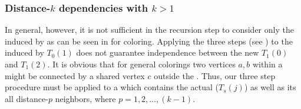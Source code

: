 	\subsubsection{Distance-$k$ dependencies with $k>1$}  \label{subsec:Dk_dependency}
In general, however, it is not sufficient in the recursion step to consider only the \subgraphs induced by \levelGroups as can be seen in  for \DTWO coloring. Applying  the three steps (see )  to  the \subgraph induced by $T_0(1)$ does not guarantee \DTWO independence between the new \levelGroups $T_1(0)$ and $T_1(2)$. It is obvious that for general \DK colorings two vertices $a,b$ within a \levelGroup might be connected by a shared vertex $c$ outside the \levelGroup.  Thus, our three step procedure must be applied to a \subgraph which contains the actual \levelGroup ($T_s(j)$) as well as its all distance-$p$ neighbors, where $p=1,2,\ldots,(k-1)$.
